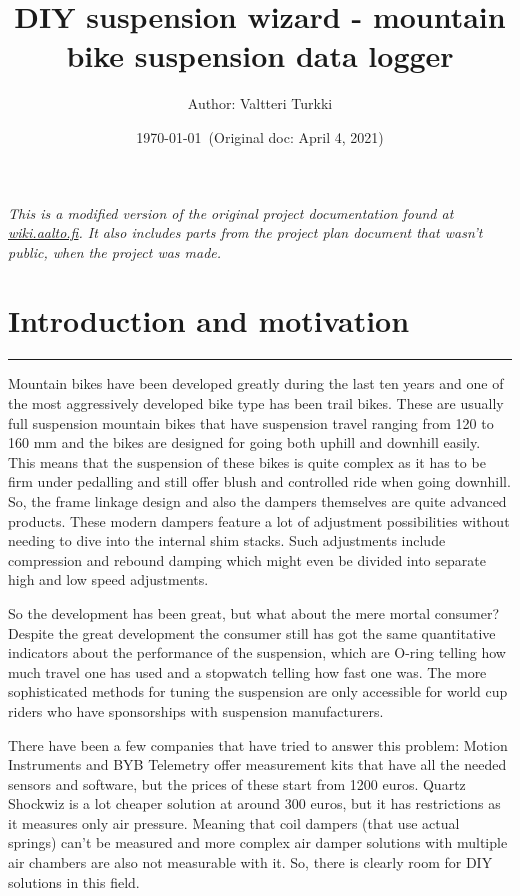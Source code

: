 \documentclass[a4paper,11pt]{article}
\title{DIY suspension wizard - mountain bike suspension data logger}
\author{Author: Valtteri Turkki}
\date{ \today\ (Original doc: April 4, 2021) }
\begin{document}
\maketitle

\textit{This is a modified version of the original project documentation found at \href{https://wiki.aalto.fi/display/MEX/DIY+suspension+wizard+-+mountain+bike+suspension+data+logger?searchId=LL4XGUSZ1}{wiki.aalto.fi}. It also includes parts from the project plan document that wasn't public, when the project was made.}\\

\vspace{2cm}

\tableofcontents

\newpage
\section{Introduction and motivation}
\label{sec:introduction}
\rule{12.7cm}{0.4pt}

Mountain bikes have been developed greatly during the last ten years and one of the most aggressively developed bike type has been trail bikes. These are usually full suspension mountain bikes that have suspension travel ranging from 120 to 160 mm and the bikes are designed for going both uphill and downhill easily. This means that the suspension of these bikes is quite complex as it has to be firm under pedalling and still offer blush and controlled ride when going downhill. So, the frame linkage design and also the dampers themselves are quite advanced products. These modern dampers feature a lot of adjustment possibilities without needing to dive into the internal shim stacks. Such adjustments include compression and rebound damping which might even be divided into separate high and low speed adjustments.

So the development has been great, but what about the mere mortal consumer? Despite the great development the consumer still has got the same quantitative indicators about the performance of the suspension, which are O-ring telling how much travel one has used and a stopwatch telling how fast one was. The more sophisticated methods for tuning the suspension are only accessible for world cup riders who have sponsorships with suspension manufacturers.

There have been a few companies that have tried to answer this problem: Motion Instruments and BYB Telemetry offer measurement kits that have all the needed sensors and software, but the prices of these start from 1200 euros. Quartz Shockwiz is a lot cheaper solution at around 300 euros, but it has restrictions as it measures only air pressure. Meaning that coil dampers (that use actual springs) can't be measured and more complex air damper solutions with multiple air chambers are also not measurable with it. So, there is clearly room for DIY solutions in this field.
\end{document}
